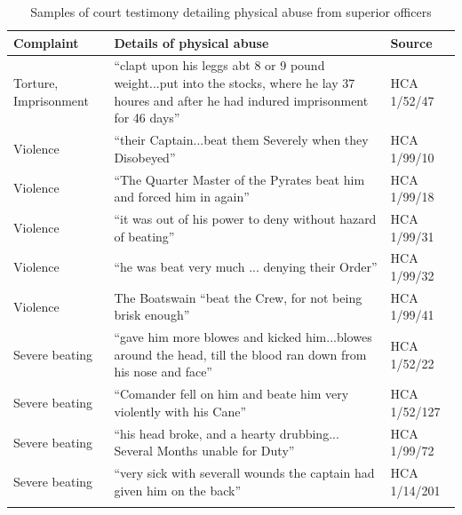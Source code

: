 \begin{table}
\caption{\label{tab:key:4.1} Samples of court testimony detailing physical abuse from superior officers}

\begin{tabularx}{\textwidth}{lQl}
\lsptoprule

\textbf{Complaint} & \textbf{Details} \textbf{of} \textbf{physical} \textbf{abuse} & \textbf{Source}\\
\midrule
Torture, Imprisonment & “clapt upon his leggs abt 8 or 9 pound weight...put into the stocks, where he lay 37 houres and after he had indured imprisonment for 46 days” & HCA 1/52/47\\
Violence & “their Captain...beat them Severely when they Disobeyed” & HCA 1/99/10\\
Violence & “The Quarter Master of the Pyrates beat him and forced him in again” & HCA 1/99/18\\
Violence & “it was out of his power to deny without hazard of beating” & HCA 1/99/31\\
Violence & “he was beat very much ... denying their Order” & HCA 1/99/32\\
Violence & The Boatswain “beat the Crew, for not being brisk enough” & HCA 1/99/41\\
Severe beating & “gave him more blowes and kicked him...blowes around the head, till the blood ran down from his nose and face” & HCA 1/52/22\\
Severe beating & “Comander fell on him and beate him very violently with his Cane” & HCA 1/52/127\\
Severe beating & “his head broke, and a hearty drubbing... Several Months unable for Duty” & HCA 1/99/72\\
Severe beating & “very sick with severall wounds the captain had given him on the back” & HCA 1/14/201\\
\lspbottomrule
\end{tabularx}
\end{table}


